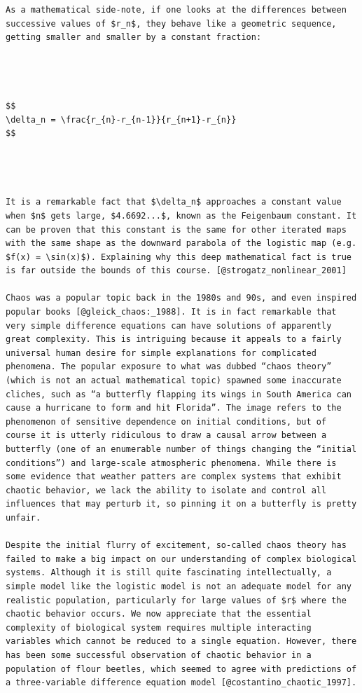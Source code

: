\documentclass[
  letterpaper,
  DIV=11,
  numbers=noendperiod]{scrreprt}
\begin{document}
\begin{verbatim}
As a mathematical side-note, if one looks at the differences between successive values of $r_n$, they behave like a geometric sequence, getting smaller and smaller by a constant fraction:




$$
\delta_n = \frac{r_{n}-r_{n-1}}{r_{n+1}-r_{n}}
$$




It is a remarkable fact that $\delta_n$ approaches a constant value when $n$ gets large, $4.6692...$, known as the Feigenbaum constant. It can be proven that this constant is the same for other iterated maps with the same shape as the downward parabola of the logistic map (e.g. $f(x) = \sin(x)$). Explaining why this deep mathematical fact is true is far outside the bounds of this course. [@strogatz_nonlinear_2001]

Chaos was a popular topic back in the 1980s and 90s, and even inspired popular books [@gleick_chaos:_1988]. It is in fact remarkable that very simple difference equations can have solutions of apparently great complexity. This is intriguing because it appeals to a fairly universal human desire for simple explanations for complicated phenomena. The popular exposure to what was dubbed “chaos theory” (which is not an actual mathematical topic) spawned some inaccurate cliches, such as “a butterfly flapping its wings in South America can cause a hurricane to form and hit Florida”. The image refers to the phenomenon of sensitive dependence on initial conditions, but of course it is utterly ridiculous to draw a causal arrow between a butterfly (one of an enumerable number of things changing the “initial conditions”) and large-scale atmospheric phenomena. While there is some evidence that weather patters are complex systems that exhibit chaotic behavior, we lack the ability to isolate and control all influences that may perturb it, so pinning it on a butterfly is pretty unfair.

Despite the initial flurry of excitement, so-called chaos theory has failed to make a big impact on our understanding of complex biological systems. Although it is still quite fascinating intellectually, a simple model like the logistic model is not an adequate model for any realistic population, particularly for large values of $r$ where the chaotic behavior occurs. We now appreciate that the essential complexity of biological system requires multiple interacting variables which cannot be reduced to a single equation. However, there has been some successful observation of chaotic behavior in a population of flour beetles, which seemed to agree with predictions of a three-variable difference equation model [@costantino_chaotic_1997].


\end{verbatim}
\end{document}
